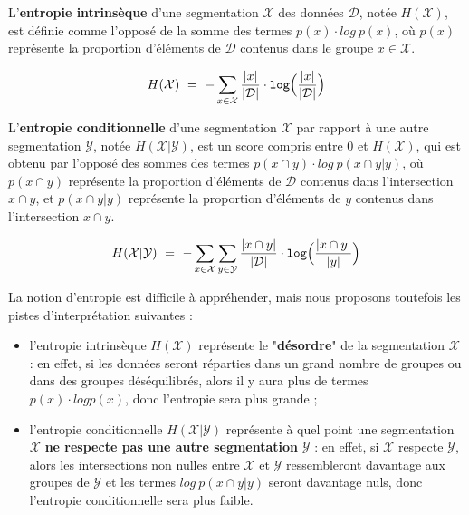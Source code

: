 		L'\textbf{entropie intrinsèque} d'une segmentation $\mathcal{X}$ des données $\mathcal{D}$, notée $H(\mathcal{X})$, est définie comme l'opposé de la somme des termes $p(x) \cdot log~p(x)$,
		où $p(x)$ représente la proportion d'éléments de $\mathcal{D}$ contenus dans le groupe $x \in \mathcal{X}$.
		
		\begin{equation}
			\label{equation:D.1-ANNEXE-EVALUATION-CLUSTERING-DEFINITION-ENTROPTY}
			H(\mathcal{X})~=~
				-
				\sum\limits_{
					x \in \mathcal{X}
				}
				\frac{
					|x|
				}{
					|\mathcal{D}|
				}
				\cdot
				\texttt{log} \Bigl(
					\frac{
						|x|
					}{
						|\mathcal{D}|
					}
				\Bigr)
		\end{equation}
		
		L'\textbf{entropie conditionnelle} d'une segmentation $\mathcal{X}$ par rapport à une autre segmentation $\mathcal{Y}$, notée $H(\mathcal{X}|\mathcal{Y})$, est un score compris entre $0$ et $H(\mathcal{X})$, qui est obtenu par l'opposé des sommes des termes $p(x \cap y) \cdot log~p(x \cap y|y)$,
		où $p(x \cap y)$ représente la proportion d'éléments de $\mathcal{D}$ contenus dans l'intersection $x \cap y$,
		et $p(x \cap y|y)$ représente la proportion d'éléments de $y$ contenus dans l'intersection $x \cap y$.
		
		\begin{equation}
			\label{equation:D.1-ANNEXE-EVALUATION-CLUSTERING-DEFINITION-ENTROPTY-CONDITIONNELLE}
			H(\mathcal{X}|\mathcal{Y})~=~
				-
				\sum\limits_{
					x \in \mathcal{X}
				}
				\sum\limits_{
					y \in \mathcal{Y}
				}
				\frac{
					|x \cap y|
				}{
					|\mathcal{D}|
				}
				\cdot
				\texttt{log} \Bigl(
					\frac{
						|x \cap y|
					}{
						|y|
					}
				\Bigr)
		\end{equation}
		
		\begin{leftBarAuthorOpinion}
			La notion d'entropie est difficile à appréhender, mais nous proposons toutefois les pistes d'interprétation suivantes :
			\begin{itemize}
				\item l'entropie intrinsèque $H(\mathcal{X})$ représente le "\textbf{désordre}" de la segmentation $\mathcal{X}$ :
				en effet, si les données seront réparties dans un grand nombre de groupes ou dans des groupes déséquilibrés, alors il y aura plus de termes $p(x) \cdot log p(x)$, donc l'entropie sera plus grande ;
				\item l'entropie conditionnelle $H(\mathcal{X}|\mathcal{Y})$ représente à quel point une segmentation $\mathcal{X}$ \textbf{ne respecte pas une autre segmentation} $\mathcal{Y}$ :
				en effet, si $\mathcal{X}$ respecte $\mathcal{Y}$, alors les intersections non nulles entre $\mathcal{X}$ et $\mathcal{Y}$ ressembleront davantage aux groupes de $\mathcal{Y}$ et les termes $log~p(x \cap y|y)$ seront davantage nuls, donc l'entropie conditionnelle sera plus faible.
			\end{itemize}
		\end{leftBarAuthorOpinion}
		
